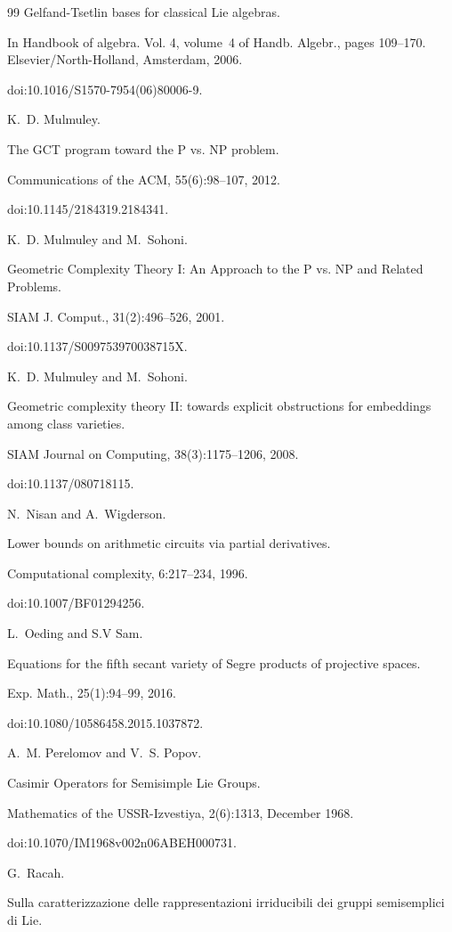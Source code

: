 \begin{thebibliography}{99}
Gelfand-Tsetlin bases for classical Lie algebras.


In Handbook of algebra. Vol. 4, volume 4 of Handb.
Algebr., pages 109–170. Elsevier/North-Holland, Amsterdam, 2006.


doi:10.1016/S1570-7954(06)80006-9.

K. D. Mulmuley.


The GCT program toward the P vs. NP problem.


Communications of the ACM, 55(6):98–107, 2012.


doi:10.1145/2184319.2184341.

K. D. Mulmuley and M. Sohoni.


Geometric Complexity Theory I: An Approach to the P vs. NP and
Related Problems.


SIAM J. Comput., 31(2):496–526, 2001.


doi:10.1137/S009753970038715X.

K. D. Mulmuley and M. Sohoni.


Geometric complexity theory II: towards explicit obstructions for
embeddings among class varieties.


SIAM Journal on Computing, 38(3):1175–1206, 2008.


doi:10.1137/080718115.

N. Nisan and A. Wigderson.


Lower bounds on arithmetic circuits via partial derivatives.


Computational complexity, 6:217–234, 1996.


doi:10.1007/BF01294256.

L. Oeding and S.V Sam.


Equations for the fifth secant variety of Segre products of
projective spaces.


Exp. Math., 25(1):94–99, 2016.


doi:10.1080/10586458.2015.1037872.

A. M. Perelomov and V. S. Popov.


Casimir Operators for Semisimple Lie Groups.


Mathematics of the USSR-Izvestiya, 2(6):1313, December 1968.


doi:10.1070/IM1968v002n06ABEH000731.

G. Racah.


Sulla caratterizzazione delle rappresentazioni irriducibili dei
gruppi semisemplici di Lie.



\end{thebibliography}
